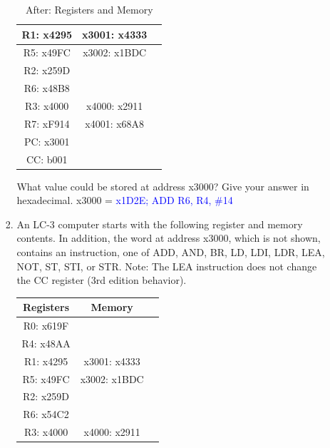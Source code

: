 \documentclass{article}
\begin{document}
\begin{enumerate}[label=(\alph*)]
\begin{enumerate}[label=(\alph*)]
\begin{enumerate}[label=(\roman*)]
\begin{table}[h]
\begin{tabular}{|c|c|c|}
            \hline
            R1: x4295 & x3001: x4333 & \\
            \hline
            R5: x49FC & x3002: x1BDC & \\
            \hline
            R2: x259D & & \\
            \hline
            R6: x48B8 & & \\
            \hline
            R3: x4000 & x4000: x2911 & \\
            \hline
            R7: xF914 & x4001: x68A8 & \\
            \hline
            PC: x3001 & & \\
            \hline
            CC: b001 & & \\
            \hline
            \end{tabular}
            \caption{After: Registers and Memory}
            \label{tab:after}
            \end{table}
            \newline
            What value could be stored at address x3000? Give your answer in hexadecimal.
            \newline
            \newline
            x3000 = \textcolor{blue}{x1D2E; ADD R6, R4, \#14}
        \newpage
        \item An LC-3 computer starts with the following register and memory contents. In addition, the word at address x3000, which is not shown, contains an instruction, one of ADD, AND, BR, LD, LDI, LDR, LEA, NOT, ST, STI, or STR. Note: The LEA instruction does not change the CC register (3rd edition behavior).
            \begin{table}[h]
            \centering
            \begin{tabular}{|c|c|c|}
            \hline
            \textbf{Registers} & \textbf{Memory} & \\
            \hline
            R0: x619F & & \\
            \hline
            R4: x48AA & & \\
            \hline
            R1: x4295 & x3001: x4333 & \\
            \hline
            R5: x49FC & x3002: x1BDC & \\
            \hline
            R2: x259D & & \\
            \hline
            R6: x54C2 & & \\
            \hline
            R3: x4000 & x4000: x2911 & \\

\end{tabular}
\end{table}
\end{enumerate}
\end{enumerate}
\end{enumerate}
\end{document}
